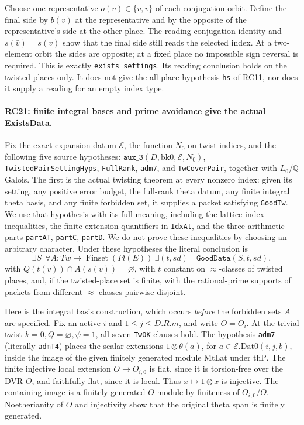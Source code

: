 Choose one representative $o(v)\in\{v,\bar v\}$ of each conjugation
orbit. Define the final side by $b(v)$ at the representative and
by the opposite of the representative's side at the other place.
The reading conjugation identity and $s(\bar v)=s(v)$ show that the
final side still reads the selected index. At a two-element orbit
the sides are opposite; at a fixed place no impossible sign reversal
is required. This is exactly \texttt{exists\_settings}.
Its reading conclusion holds on the twisted places only.
It does not give the all-place hypothesis \texttt{hs} of RC11,
nor does it supply a reading for an empty index type.

\paragraph{RC21: finite integral bases and prime avoidance give the actual ExistsData.}
Fix the exact expansion datum $\mathcal E$, the function $N_0$ on
twist indices, and the following five source hypotheses:
$\texttt{aux\_3}(D,\mathrm{bk0},\mathcal E,N_0)$,
\texttt{TwistedPairSettingHyps}, \texttt{FullRank},
\texttt{adm7}, and \texttt{TwCoverPair}, together with
$L_0/\mathbb Q$ Galois. The first is the actual twisting theorem
at every nonzero index: given its setting, any positive error budget,
the full-rank theta datum, any finite integral theta basis, and any
finite forbidden set, it supplies a packet satisfying
\texttt{GoodTw}. We use that hypothesis with its full meaning,
including the lattice-index inequalities, the finite-extension
quantifiers in \texttt{IdxAt}, and the three arithmetic parts
\texttt{partAT}, \texttt{partC}, \texttt{partD}.
We do not prove these inequalities by choosing an arbitrary character.
Under these hypotheses the literal conclusion is
\[
 \exists S\ \ \forall A:Tw\to\operatorname{Finset}(Pl(E))\
 \exists(t,sd)\quad \texttt{GoodData}(S,t,sd),             \tag{RC.23}
\]
with $Q(t(v))\cap A(s(v))=\varnothing$, with $t$ constant on
$\approx$-classes of twisted places, and, if the twisted-place
set is finite, with the rational-prime supports of packets from
different $\approx$-classes pairwise disjoint.

Here is the integral basis construction, which occurs \emph{before}
the forbidden sets $A$ are specified. Fix an active $i$ and
$1\le j\le D.R.m$, and write $O=O_i$.
At the trivial twist $k=0,Q=\varnothing,\psi=1$, all seven
\texttt{TwOK} clauses hold. The hypothesis \texttt{adm7}
(literally \texttt{admT4}) places the scalar extensions
$1\otimes\theta(a)$, for $a\in\mathcal E.\mathrm{Dat0}(i,j,b)$,
inside the image of the given finitely generated module
$\mathrm{MtLat}$ under $\mathrm{thP}$.
The finite injective local extension $O\to O_{i,0}$ is flat, since it
is torsion-free over the DVR $O$, and faithfully flat, since it is local.
Thus $x\mapsto1\otimes x$ is injective. The containing image is a
finitely generated $O$-module by finiteness of $O_{i,0}/O$.
Noetherianity of $O$ and injectivity show that the original theta span
is finitely generated.

